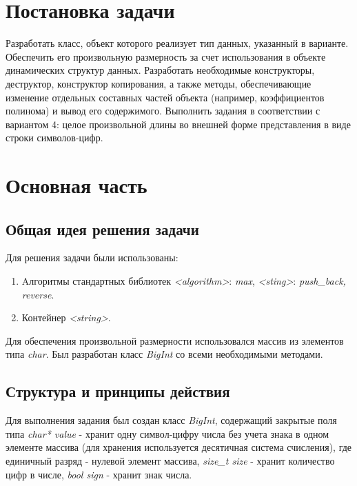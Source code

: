 \documentclass[a4paper,14pt]{article}
\begin{document}

\setcounter{page}{2} %

\renewcommand\contentsname{\centering {\normalsize Содержание}}
\tableofcontents
\newpage

\section*{Постановка задачи}

Разработать класс, объект которого реализует тип данных, указанный в варианте. Обеспечить его произвольную размерность за счет использования в объекте динамических структур данных. Разработать
необходимые конструкторы, деструктор, конструктор копирования, а также методы, обеспечивающие
изменение отдельных составных частей объекта (например, коэффициентов полинома) и вывод его содержимого. Выполнить задания в соответствии с вариантом 4: целое произвольной длины во внешней форме представления в виде строки символов-цифр.

\newpage

\section{Основная часть}
\subsection{Общая идея решения задачи}
Для решения задачи были использованы:
\begin{enumerate}
	\item Aлгоритмы стандартных библиотек \textit{<algorithm>}: \textit{max}, \textit{<sting>}: \textit{push\_back, reverse}.
	\item Контейнер \textit{<string>}.
\end{enumerate}
Для обеспечения произвольной размерности использовался массив из элементов типа \textit{char}. Был разработан класс \textit{BigInt} со всеми необходимыми методами. 
\subsection{Структура и принципы действия}
Для выполнения задания был создан класс \textit{BigInt}, содержащий закрытые поля типа \textit{char* value} - хранит одну символ-цифру числа без учета знака в одном элементе массива (для хранения используется десятичная система счисления), где единичный разряд - нулевой элемент массива, \textit{size\_t size} - хранит количество цифр в числе, \textit{bool sign} - хранит знак числа.
\end{document}
